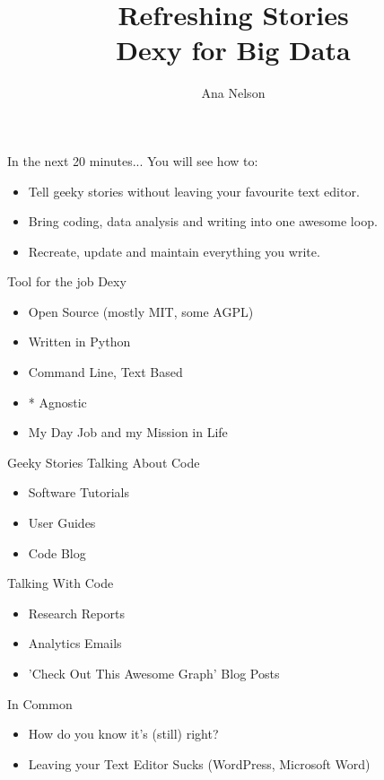 \documentclass{beamer}
\title[Dexy for Big Data]{Refreshing Stories\\Dexy for Big Data}
\author{Ana Nelson}
\institute{dexy.it}
\begin{document}
\begin{frame}
\titlepage
\end{frame}


\begin{frame}{In the next 20 minutes...}
You will see how to:
\begin{itemize}
\item{Tell geeky stories without leaving your favourite text editor.}
\item{Bring coding, data analysis and writing into one awesome loop.}
\item{Recreate, update and maintain everything you write.}
\end{itemize}
\end{frame}

\begin{frame}{Tool for the job}
Dexy
\begin{itemize}
\item{Open Source (mostly MIT, some AGPL)}
\item{Written in Python}
\item{Command Line, Text Based}
\item{* Agnostic}
\item{My Day Job and my Mission in Life}
\end{itemize}
\end{frame}

\begin{frame}{Geeky Stories}
Talking About Code
\begin{itemize}
\item{Software Tutorials}
\item{User Guides}
\item{Code Blog}
\end{itemize}
Talking With Code
\begin{itemize}
\item{Research Reports}
\item{Analytics Emails}
\item{'Check Out This Awesome Graph' Blog Posts}
\end{itemize}
\end{frame}

\begin{frame}{In Common}
\begin{itemize}
\item{How do you know it's (still) right?}
\item{Leaving your Text Editor Sucks (WordPress, Microsoft Word)}
\end{itemize}
\end{frame}
\end{document}
